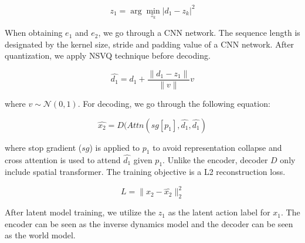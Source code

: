 \documentclass{article} %
\begin{document}
\begin{equation}
    z_1 = \arg \min_{z_k} |d_1 - z_k|^2
\end{equation}

{When obtaining $e_1$ and $e_2$, we go through a CNN network. The sequence length is designated by the kernel size, stride and padding value of a CNN network. After quantization, we apply NSVQ technique before decoding.}

\begin{equation}
    \hat{d_1} =  d_1 + \frac{\|d_1-z_1\|}{\|v\|}v 
\end{equation}

{where $v \sim \mathcal{N}(0,1)$. For decoding, we go through the following equation:}

\begin{equation}
    \hat{x_2} = D(Attn(sg[p_1],\hat{d_1},\hat{d_1})
\end{equation}

{where stop gradient ($sg$) is applied to $p_1$ to avoid representation collapse and cross attention is used to attend $\hat{d_1}$ given $p_1$. Unlike the encoder, decoder $D$ only include spatial transformer. The training objective is a L2 reconstruction loss.}

\begin{equation}
    L = \|x_2-\hat{x_2}\|_2^2
\end{equation}

After latent model training, we utilize the {$z_{1}$} as the latent action label for $x_{1}$. The encoder can be seen as the inverse dynamics model and the decoder can be seen as the world model. 
\end{document}
